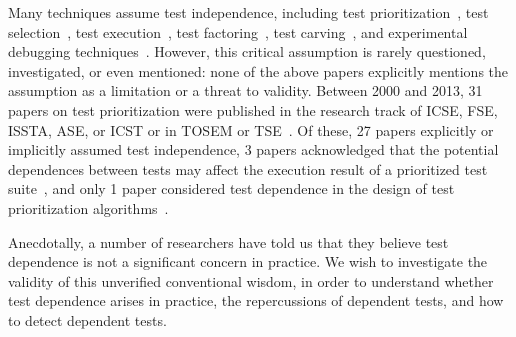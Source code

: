 Many techniques assume test independence, including test
prioritization~\cite{Elbaum:2000:PTC:347324.348910,
Rummel:2005:TPR:1066677.1067016, Srivastava:2002:EPT:566172.566187, Jiang:2009:ART},
test selection~\cite{harroldetal:OOPSLA:2001, Orso:2004:SRT,
Briand:2009:ART, Zhang:2012:RMT, Nanda:2011:RTP, hsu09may},
test execution~\cite{Kim:2013:OUT, Misailovic:2007},
test factoring~\cite{Saff:2005, Wu:2010:LRV}, test carving~\cite{Elbaum:2006},
and experimental debugging techniques~\cite{Zeller:2002,
Steimann:2013, Zhang:2013:IMF}.
However, this critical assumption is
rarely questioned, investigated, or even mentioned:
none of the above papers explicitly mentions the assumption
as a limitation or a threat to validity.
Between 2000 and 2013, 31 papers on test prioritization were
published in the research track of
ICSE, FSE, ISSTA, ASE, or ICST or in
TOSEM or TSE~\cite{alltestprior}. Of these,
27 papers explicitly or implicitly assumed test independence,
3 papers acknowledged that the potential dependences between tests
may affect the execution result of a prioritized test suite~\cite{Kim:2002:HTP:581339.581357,
Qu:2008:CRT, Rothermel:2004:TSC},
and only 1 paper considered test dependence in the design of
test prioritization algorithms~\cite{10.1109/TSE.2012.26}.

Anecdotally, a number of researchers have told us that they believe test dependence
is not a significant concern in practice.
We wish to investigate the validity of this unverified conventional wisdom,
in order to understand whether test dependence arises in practice, 
the repercussions of dependent tests, and how to 
detect dependent tests.


